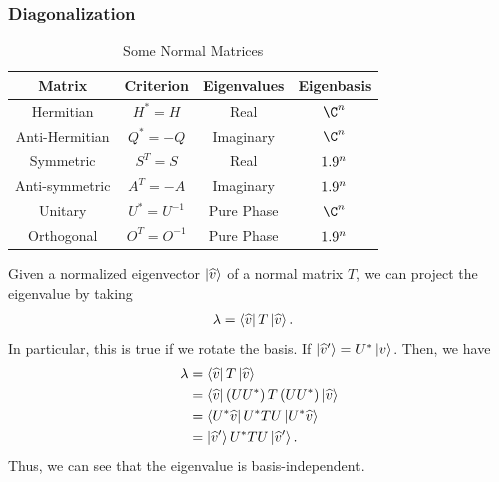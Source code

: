 \documentclass[10pt]{mypackage}
\begin{document}
\subsubsection{Diagonalization}%
\begin{table}
  \centering
  \renewcommand{\arraystretch}{1.5}
  \begin{tabular}{cc|cc}
    Matrix & Criterion & Eigenvalues & Eigenbasis\\
    \hline\hline
    Hermitian & $H^{\ast} = H$ & Real & $\C^n$\\
    Anti-Hermitian & $Q^{\ast} = -Q$ & Imaginary & $\C^n$\\
    Symmetric & $S^{T} = S$ & Real & $1.9^n$\\
    Anti-symmetric & $A^{T} = -A$ & Imaginary & $1.9^n$\\
    Unitary & $U^{\ast} = U^{-1}$ & Pure Phase & $\C^n$\\
    Orthogonal & $O^{T} = O^{-1}$ & Pure Phase & $1.9^n$
  \end{tabular}
  \caption{Some Normal Matrices}
\end{table}
Given a normalized eigenvector $\ket{\widehat{v}}$ of a normal matrix $T$, we can project the eigenvalue by taking
\begin{align*}
  \lambda &= \bra{\widehat{v}}T\ket{\widehat{v}}.
\end{align*}
In particular, this is true if we rotate the basis. If $\ket{\widehat{v}'} = U^{\ast}\ket{v}$. Then, we have
\begin{align*}
  \lambda &= \bra{\widehat{v}}T \ket{\widehat{v}}\\
          &= \bra{\widehat{v}}\left(UU^{\ast}\right)T \left(UU^{\ast}\right)\ket{\widehat{v}}\\
          &= \bra{U^{\ast}\widehat{v}}U^{\ast} T U\ket{U^{\ast}\widehat{v}}\\
          &= \ket{\widehat{v}'}U^{\ast}TU\ket{\widehat{v}'}.
\end{align*}
Thus, we can see that the eigenvalue is basis-independent.\newline
\end{document}
